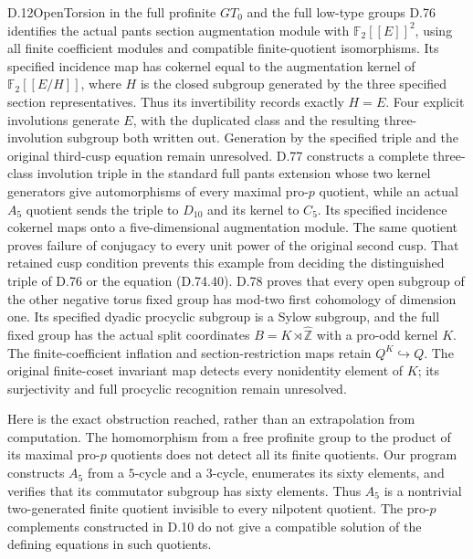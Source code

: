 \begin{claim}{D.12}{Open}{Torsion in the full profinite $GT_0$ and the full low-type groups}
D.76 identifies the actual pants section augmentation module with $\mathbb F_2[[E]]^2$, using all finite coefficient modules and compatible finite-quotient isomorphisms. Its specified incidence map has cokernel equal to the augmentation kernel of $\mathbb F_2[[E/H]]$, where $H$ is the closed subgroup generated by the three specified section representatives. Thus its invertibility records exactly $H=E$. Four explicit involutions generate $E$, with the duplicated class and the resulting three-involution subgroup both written out. Generation by the specified triple and the original third-cusp equation remain unresolved.
D.77 constructs a complete three-class involution triple in the standard full pants extension whose two kernel generators give automorphisms of every maximal pro-$p$ quotient, while an actual $A_5$ quotient sends the triple to $D_{10}$ and its kernel to $C_5$. Its specified incidence cokernel maps onto a five-dimensional augmentation module. The same quotient proves failure of conjugacy to every unit power of the original second cusp. That retained cusp condition prevents this example from deciding the distinguished triple of D.76 or the equation (D.74.40).
D.78 proves that every open subgroup of the other negative torus fixed group has mod-two first cohomology of dimension one. Its specified dyadic procyclic subgroup is a Sylow subgroup, and the full fixed group has the actual split coordinates $B=K\rtimes\widehat{\mathbb Z}$ with a pro-odd kernel $K$. The finite-coefficient inflation and section-restriction maps retain $Q^K\hookrightarrow Q$. The original finite-coset invariant map detects every nonidentity element of $K$; its surjectivity and full procyclic recognition remain unresolved.
\end{claim}
Here is the exact obstruction reached, rather than an extrapolation from computation. The homomorphism from a free profinite group to the product of its maximal pro-$p$ quotients does not detect all its finite quotients. Our program constructs $A_5$ from a $5$-cycle and a $3$-cycle, enumerates its sixty elements, and verifies that its commutator subgroup has sixty elements. Thus $A_5$ is a nontrivial two-generated finite quotient invisible to every nilpotent quotient. The pro-$p$ complements constructed in D.10 do not give a compatible solution of the defining equations in such quotients.

